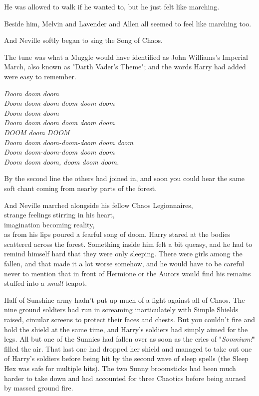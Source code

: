 He was allowed to walk if he wanted to, but he just felt like marching.

Beside him, Melvin and Lavender and Allen all seemed to feel like marching too.

And Neville softly began to sing the Song of Chaos.

The tune was what a Muggle would have identified as John Williams's Imperial 
March, also known as "Darth Vader's Theme"; and the words Harry had added were 
easy to remember.

\emph{Doom doom doom\\
Doom doom doom doom doom doom\\
Doom doom doom\\
Doom doom doom doom doom doom\\
DOOM doom DOOM\\
Doom doom doom-doom-doom doom doom\\
Doom doom-doom-doom doom doom\\
Doom doom doom, doom doom doom.}

By the second line the others had joined in, and soon you could hear the same 
soft chant coming from nearby parts of the forest.

And Neville marched alongside his fellow Chaos Legionnaires,\\
strange feelings stirring in his heart,\\
imagination becoming reality,\\
as from his lips poured a fearful song of doom.
\sbreak
Harry stared at the bodies scattered across the forest. Something inside him 
felt a bit queasy, and he had to remind himself hard that they were only 
sleeping. There were girls among the fallen, and that made it a lot worse 
somehow, and he would have to be careful never to mention that in front of 
Hermione or the Aurors would find his remains stuffed into a \emph{small} 
teapot.

Half of Sunshine army hadn't put up much of a fight against all of Chaos. The 
nine ground soldiers had run in screaming inarticulately with Simple Shields 
raised, circular screens to protect their faces and chests. But you couldn't 
fire and hold the shield at the same time, and Harry's soldiers had simply 
aimed for the legs. All but one of the Sunnies had fallen over as soon as the 
cries of "\emph{Somnium!}" filled the air. That last one had dropped her shield 
and managed to take out one of Harry's soldiers before being hit by the second 
wave of sleep spells (the Sleep Hex was safe for multiple hits). The two Sunny 
broomsticks had been much harder to take down and had accounted for three 
Chaotics before being auraed by massed ground fire.

